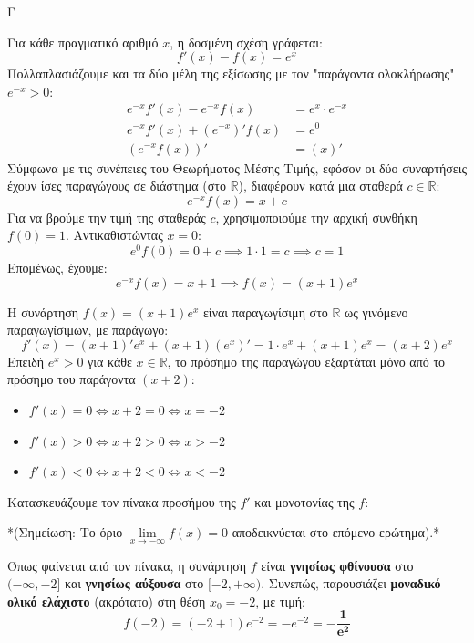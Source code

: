 \begin{thema}{Γ}
\begin{erwthma}
\item Για κάθε πραγματικό αριθμό $x$, η δοσμένη σχέση γράφεται:
\[ f'(x) - f(x) = e^x \]
Πολλαπλασιάζουμε και τα δύο μέλη της εξίσωσης με τον "παράγοντα ολοκλήρωσης" $e^{-x} > 0$:
\begin{align*}
e^{-x} f'(x) - e^{-x} f(x) &= e^x \cdot e^{-x} \\
e^{-x} f'(x) + (e^{-x})' f(x) &= e^0 \\
\left( e^{-x} f(x) \right)' &= (x)'
\end{align*}
Σύμφωνα με τις συνέπειες του Θεωρήματος Μέσης Τιμής, εφόσον οι δύο συναρτήσεις έχουν ίσες παραγώγους σε διάστημα (στο $\mathbb{R}$), διαφέρουν κατά μια σταθερά $c \in \mathbb{R}$:
\[ e^{-x} f(x) = x + c \]
Για να βρούμε την τιμή της σταθεράς $c$, χρησιμοποιούμε την αρχική συνθήκη $f(0) = 1$. Αντικαθιστώντας $x = 0$:
\[ e^0 f(0) = 0 + c \implies 1 \cdot 1 = c \implies c = 1 \]
Επομένως, έχουμε:
\[ e^{-x} f(x) = x + 1 \implies f(x) = (x + 1) e^x \]

\item Η συνάρτηση $f(x) = (x+1) e^x$ είναι παραγωγίσιμη στο $\mathbb{R}$ ως γινόμενο παραγωγίσιμων, με παράγωγο:
\[ f'(x) = (x+1)' e^x + (x+1) (e^x)' = 1 \cdot e^x + (x+1) e^x = (x+2) e^x \]
Επειδή $e^x > 0$ για κάθε $x \in \mathbb{R}$, το πρόσημο της παραγώγου εξαρτάται μόνο από το πρόσημο του παράγοντα $(x+2)$:
\begin{itemize}
    \item $f'(x) = 0 \Leftrightarrow x+2 = 0 \Leftrightarrow x = -2$
    \item $f'(x) > 0 \Leftrightarrow x+2 > 0 \Leftrightarrow x > -2$
    \item $f'(x) < 0 \Leftrightarrow x+2 < 0 \Leftrightarrow x < -2$
\end{itemize}
Κατασκευάζουμε τον πίνακα προσήμου της $f'$ και μονοτονίας της $f$:
\begin{center}
\end{center}
*(Σημείωση: Tο όριο $\lim\limits_{x \to -\infty} f(x) = 0$ αποδεικνύεται στο επόμενο ερώτημα).*

Όπως φαίνεται από τον πίνακα, η συνάρτηση $f$ είναι \textbf{γνησίως φθίνουσα} στο $(-\infty, -2]$ και \textbf{γνησίως αύξουσα} στο $[-2, +\infty)$.
Συνεπώς, παρουσιάζει \textbf{μοναδικό ολικό ελάχιστο} (ακρότατο) στη θέση $x_0 = -2$, με τιμή:
\[ f(-2) = (-2+1) e^{-2} = -e^{-2} = \boldsymbol{-\frac{1}{e^2}} \]


\end{erwthma}
\end{thema}
